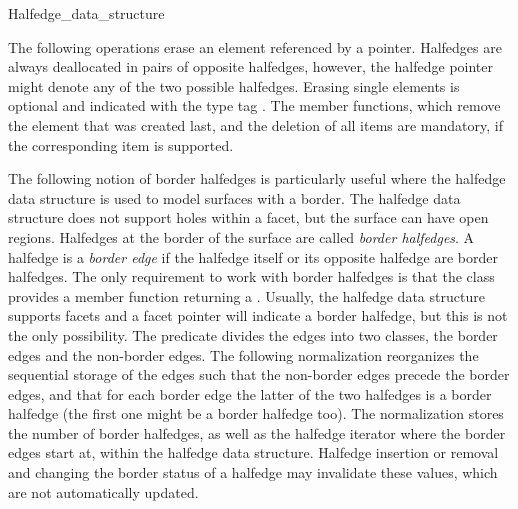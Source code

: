 \begin{ccClass}{Halfedge_data_structure}
\vspace*{-2mm}

The following operations erase an element referenced by a pointer.
Halfedges are always deallocated in pairs of opposite halfedges,
however, the halfedge pointer might denote any of the two possible
halfedges.  Erasing single elements is optional and indicated with the
type tag . The  member functions,
which remove the element that was created last, and the deletion of
all items are mandatory, if the corresponding item is supported.

\ccGlue
{} 
\ccGlue
{}
\vspace*{-2mm}

\ccGlue
{}
\ccGlue
{}
\ccGlue
{}


\begin{ccAdvanced}
  
The following notion of border halfedges is particularly useful
where the halfedge data structure is used to model surfaces with a
border. The halfedge data structure does not support holes within a
facet, but the surface can have open regions. Halfedges at the border
of the surface are called {\em border halfedges}. A halfedge is a {\em
  border edge\/} if the halfedge itself or its opposite halfedge are
border halfedges. The only requirement to work with border halfedges
is that the  class provides a member function
 returning a . Usually, the halfedge data
structure supports facets and a  facet pointer will indicate
a border halfedge, but this is not the only possibility.  The
 predicate divides the edges into two classes, the
border edges and the non-border edges. The following normalization
reorganizes the sequential storage of the edges such that the
non-border edges precede the border edges, and that for each border
edge the latter of the two halfedges is a border halfedge (the first
one might be a border halfedge too). The normalization stores the
number of border halfedges, as well as the halfedge iterator where the
border edges start at, within the halfedge data structure.  Halfedge
insertion or removal and changing the border status of a halfedge may
invalidate these values, which are not automatically updated.


\end{ccAdvanced}
\end{ccClass}
